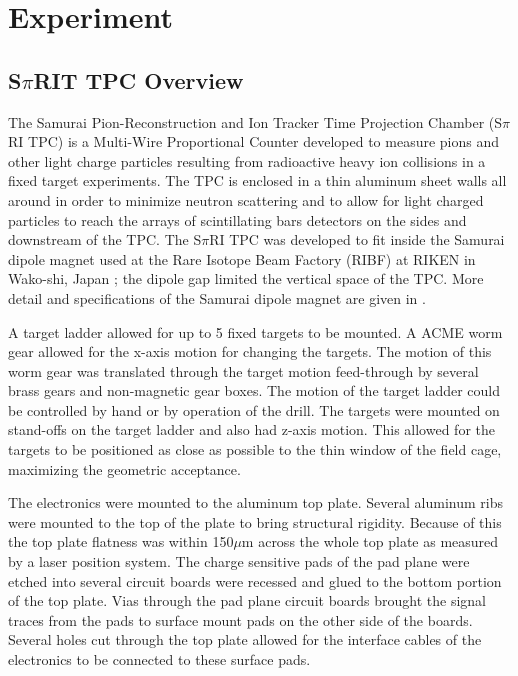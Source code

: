 \chapter{Experiment}

\section{S$\pi$RIT TPC Overview}
The Samurai Pion-Reconstruction and Ion Tracker Time Projection Chamber (S$\pi$RI TPC) is a Multi-Wire Proportional Counter developed to measure pions and other light charge particles resulting from radioactive heavy ion collisions in a fixed target experiments.  The TPC is enclosed in a thin aluminum sheet walls all around in order to minimize neutron scattering and to allow for light charged particles to reach the arrays of scintillating bars detectors on the sides and downstream of the TPC. The S$\pi$RI TPC was developed to fit inside the Samurai dipole magnet used at the Rare Isotope Beam Factory (RIBF) at RIKEN in Wako-shi, Japan \cite{riken}; the dipole gap limited the vertical space of the TPC. More detail and specifications of the Samurai dipole magnet are given in \cite{samurai}. 

A target ladder allowed for up to 5 fixed targets to be mounted. A ACME worm gear allowed for the x-axis motion for changing the targets. The motion of this worm gear was translated through the target motion feed-through by several brass gears and non-magnetic gear boxes. The motion of the target ladder could be controlled by hand or by operation of the drill. The targets were mounted on stand-offs on the target ladder and also had z-axis motion. This allowed for the targets to be positioned as close as possible to the thin window of the field cage, maximizing the geometric acceptance. 

The electronics were mounted to the aluminum top plate. Several aluminum ribs were mounted to the top of the plate to bring structural rigidity. Because of this the top plate flatness was within 150$\mu$m across the whole top plate as measured by a laser position system. The charge sensitive pads of the pad plane were etched into several circuit boards were recessed and glued to the bottom portion of the top plate. Vias through the pad plane circuit boards brought the signal traces from the pads to surface mount pads on the other side of the boards. Several holes cut through the top plate allowed for the interface cables of the electronics to be connected to these surface pads. 

